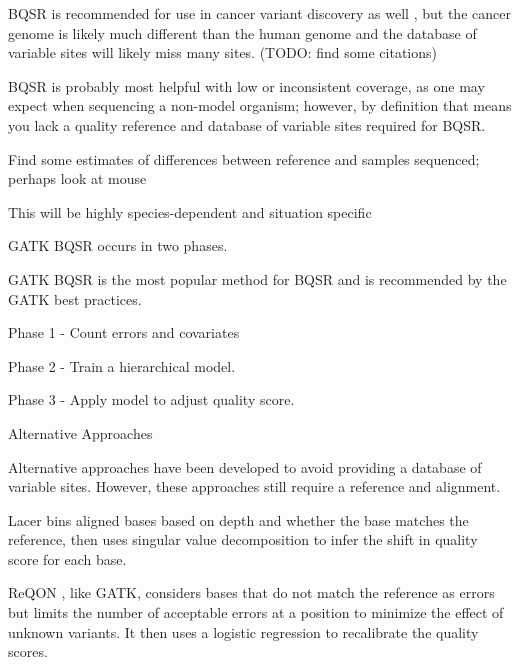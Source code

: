 \documentclass{article}
\begin{document}
\begin{outline}
\begin{outline}
\begin{outline}
\begin{outline}
			\end{outline}
			\item BQSR is recommended for use in cancer variant discovery as well \parencite{cibulskis_sensitive_2013}, but the cancer genome is likely much different than the human genome and the database of variable sites will likely miss many sites. (TODO: find some citations)
		\end{outline}
		\item BQSR is probably most helpful with low or inconsistent coverage, as one may expect when sequencing a non-model organism; however, by definition that means you lack a quality reference and database of variable sites required for BQSR.
			\begin{outline}
				\item Find some estimates of differences between reference and samples sequenced; perhaps look at mouse
				\item This will be highly species-dependent and situation specific
			\end{outline}
		\item GATK BQSR occurs in two phases.
			\begin{outline}
				\item GATK BQSR is the most popular method for BQSR and is recommended by the GATK best practices.
				\item Phase 1 - Count errors and covariates
				\item Phase 2 - Train a hierarchical model.
				\item Phase 3 - Apply model to adjust quality score.
			\end{outline}
		\item Alternative Approaches
			\begin{outline}
			\item Alternative approaches have been developed to avoid providing a database of variable sites. However, these approaches still require a reference and alignment.
			\item Lacer \parencite{chung_lacer:_2017} bins aligned bases based on depth and whether the base matches the reference, then uses singular value decomposition to infer the shift in quality score for each base.
			\item ReQON \parencite{cabanski_reqon:_2012}, like GATK, considers bases that do not match the reference as errors but limits the number of acceptable errors at a position to minimize the effect of unknown variants. It then uses a logistic regression to recalibrate the quality scores.

\end{outline}
\end{outline}
\end{outline}
\end{document}
